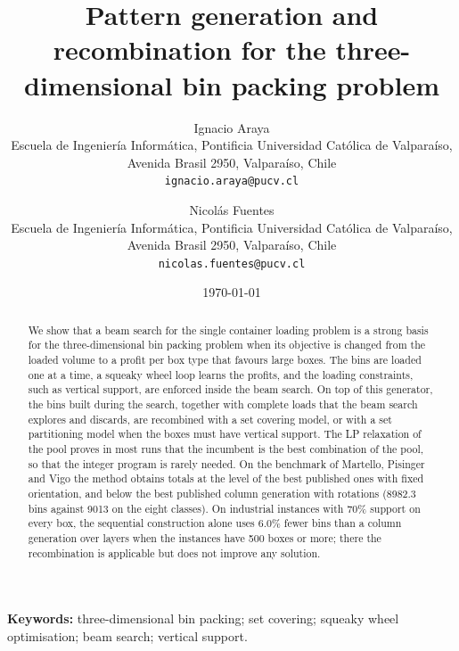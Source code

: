 \documentclass[11pt]{article}
\title{Pattern generation and recombination for the three-dimensional bin packing problem}
\author{Ignacio Araya\\[2pt]
\small Escuela de Ingenier\'ia Inform\'atica, Pontificia Universidad Cat\'olica de Valpara\'iso,\\
\small Avenida Brasil 2950, Valpara\'iso, Chile\\
\small \texttt{ignacio.araya@pucv.cl}
\and
Nicol\'as Fuentes\\[2pt]
\small Escuela de Ingenier\'ia Inform\'atica, Pontificia Universidad Cat\'olica de Valpara\'iso,\\
\small Avenida Brasil 2950, Valpara\'iso, Chile\\
\small \texttt{nicolas.fuentes@pucv.cl}}
\date{\today}
\begin{document}
\maketitle

\begin{abstract}
We show that a beam search for the single container loading problem is a strong basis for the
three-dimensional bin packing problem when its objective is changed from the loaded volume to a profit per
box type that favours large boxes. The bins are loaded one at a time, a squeaky wheel loop learns the profits,
and the loading constraints, such as vertical support, are enforced inside the beam search. On top of this
generator, the bins built during the search, together with complete loads that the beam search explores and
discards, are recombined with a set covering model, or with a set partitioning model when the boxes must have
vertical support. The LP relaxation of the pool proves in most runs that the incumbent is the best
combination of the pool, so that the integer program is rarely needed. On the benchmark of Martello,
Pisinger and Vigo the method obtains totals at the level of the best published ones with fixed
orientation, and below the best published column generation with rotations (8982.3 bins against 9013
on the eight classes). On industrial instances with 70\% support on every box, the sequential construction alone uses 6.0\%
fewer bins than a column generation over layers when the instances have 500 boxes or more; there the
recombination is applicable but does not improve any solution.
\end{abstract}

\noindent\textbf{Keywords:} three-dimensional bin packing; set covering; squeaky wheel optimisation;
beam search; vertical support.

\begingroup
\renewcommand{\contentsname}{Pending items (remove before submission)}
\endgroup
\clearpage







\appendix





\end{document}
